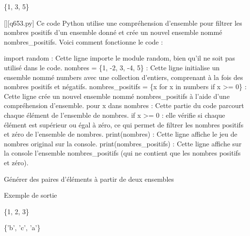 \{1, 3, 5\}
        \par
        \begin{solution}
            \renewcommand{\nomfichier}{q653.py}
            \pythonfile{\chemincode \nomfichier}[][\nomfichier]
            Ce code Python utilise une compréhension d'ensemble pour filtrer les nombres positifs d'un ensemble donné et crée un nouvel ensemble nommé nombres\_positifs. Voici comment fonctionne le code :

    import random : Cette ligne importe le module random, bien qu'il ne soit pas utilisé dans le code.
    nombres = \{1, -2, 3, -4, 5\} : Cette ligne initialise un ensemble nommé numbers avec une collection d'entiers, comprenant à la fois des nombres positifs et négatifs.
    nombres\_positifs = \{x for x in numbers if x >= 0\} : Cette ligne crée un nouvel ensemble nommé nombres\_positifs à l'aide d'une compréhension d'ensemble.
        pour x dans nombres : Cette partie du code parcourt chaque élément de l'ensemble de nombres.
        if x >= 0 : elle vérifie si chaque élément est supérieur ou égal à zéro, ce qui permet de filtrer les nombres positifs et zéro de l'ensemble de nombres.
    print(nombres) : Cette ligne affiche le jeu de nombres original sur la console.
    print(nombres\_positifs) : Cette ligne affiche sur la console l'ensemble nombres\_positifs (qui ne contient que les nombres positifs et zéro).
        \end{solution}
        

        \question
        Générer des paires d'éléments à partir de deux ensembles

Exemple de sortie

\{1, 2, 3\}

\{'b', 'c', 'a'\}

